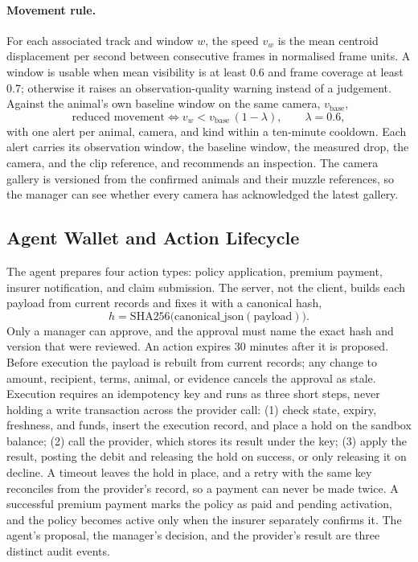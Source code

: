 \documentclass[11pt,letterpaper]{article}
\begin{document}
\paragraph{Movement rule.} For each associated track and window $w$, the speed $v_w$ is the mean centroid displacement per second between consecutive frames in normalised frame units. A window is usable when mean visibility is at least 0.6 and frame coverage at least 0.7; otherwise it raises an observation-quality warning instead of a judgement. Against the animal's own baseline window on the same camera, $v_{\text{base}}$,
\begin{equation}
\text{reduced movement} \iff v_w < v_{\text{base}}\,(1 - \lambda), \qquad \lambda = 0.6,
\end{equation}
with one alert per animal, camera, and kind within a ten-minute cooldown. Each alert carries its observation window, the baseline window, the measured drop, the camera, and the clip reference, and recommends an inspection. The camera gallery is versioned from the confirmed animals and their muzzle references, so the manager can see whether every camera has acknowledged the latest gallery.

\subsection{Agent Wallet and Action Lifecycle}

The agent prepares four action types: policy application, premium payment, insurer notification, and claim submission. The server, not the client, builds each payload from current records and fixes it with a canonical hash,
\begin{equation}
h = \mathrm{SHA256}\big(\mathrm{canonical\_json}(\text{payload})\big).
\end{equation}
Only a manager can approve, and the approval must name the exact hash and version that were reviewed. An action expires 30 minutes after it is proposed. Before execution the payload is rebuilt from current records; any change to amount, recipient, terms, animal, or evidence cancels the approval as stale. Execution requires an idempotency key and runs as three short steps, never holding a write transaction across the provider call: (1) check state, expiry, freshness, and funds, insert the execution record, and place a hold on the sandbox balance; (2) call the provider, which stores its result under the key; (3) apply the result, posting the debit and releasing the hold on success, or only releasing it on decline. A timeout leaves the hold in place, and a retry with the same key reconciles from the provider's record, so a payment can never be made twice. A successful premium payment marks the policy as paid and pending activation, and the policy becomes active only when the insurer separately confirms it. The agent's proposal, the manager's decision, and the provider's result are three distinct audit events.
\end{document}
